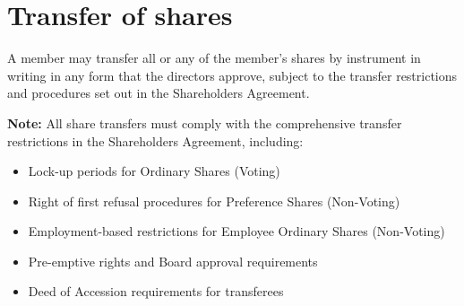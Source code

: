 \section{Transfer of shares}

A member may transfer all or any of the member's shares by instrument in writing in any form that the directors approve, subject to the transfer restrictions and procedures set out in the Shareholders Agreement.

\textbf{Note:} All share transfers must comply with the comprehensive transfer restrictions in the Shareholders Agreement, including:
\begin{itemize}
    \item Lock-up periods for Ordinary Shares (Voting)
    \item Right of first refusal procedures for Preference Shares (Non-Voting)
    \item Employment-based restrictions for Employee Ordinary Shares (Non-Voting)
    \item Pre-emptive rights and Board approval requirements
    \item Deed of Accession requirements for transferees
\end{itemize} 